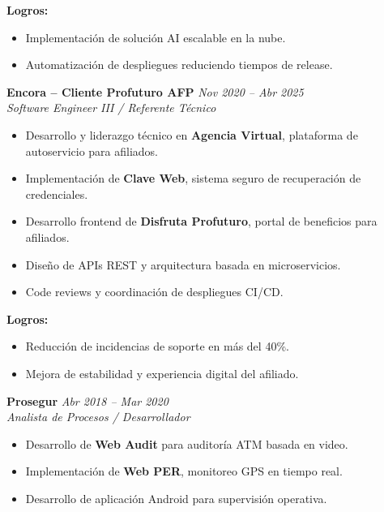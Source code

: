 \documentclass[11pt,a4paper]{article}
\begin{document}
\textbf{Logros:}
\begin{itemize}[leftmargin=*]
  \item Implementación de solución AI escalable en la nube.
  \item Automatización de despliegues reduciendo tiempos de release.
\end{itemize}

\vspace{6pt}

\textbf{Encora – Cliente Profuturo AFP} \hfill \textit{Nov 2020 – Abr 2025}\\
\textit{Software Engineer III / Referente Técnico}

\begin{itemize}[leftmargin=*]
  \item Desarrollo y liderazgo técnico en \textbf{Agencia Virtual}, plataforma de autoservicio para afiliados.
  \item Implementación de \textbf{Clave Web}, sistema seguro de recuperación de credenciales.
  \item Desarrollo frontend de \textbf{Disfruta Profuturo}, portal de beneficios para afiliados.
  \item Diseño de APIs REST y arquitectura basada en microservicios.
  \item Code reviews y coordinación de despliegues CI/CD.
\end{itemize}

\textbf{Logros:}
\begin{itemize}[leftmargin=*]
  \item Reducción de incidencias de soporte en más del 40\%.
  \item Mejora de estabilidad y experiencia digital del afiliado.
\end{itemize}

\vspace{6pt}

\textbf{Prosegur} \hfill \textit{Abr 2018 – Mar 2020}\\
\textit{Analista de Procesos / Desarrollador}

\begin{itemize}[leftmargin=*]
  \item Desarrollo de \textbf{Web Audit} para auditoría ATM basada en video.
  \item Implementación de \textbf{Web PER}, monitoreo GPS en tiempo real.
  \item Desarrollo de aplicación Android para supervisión operativa.
\end{itemize}
\end{document}
